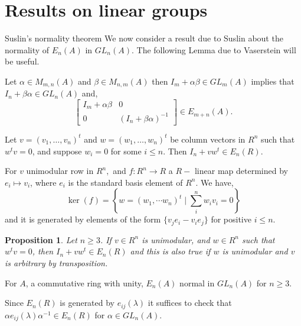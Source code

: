 \documentclass{beamer}
\newcounter{dummy} \numberwithin{dummy}{section}
\newtheorem{proposition}[dummy]{Proposition}
\begin{document}
\section{Results on linear groups}
\begin{frame}[allowframebreaks]{Suslin's normality theorem}
	We now consider a result due to Suslin about the normality of $E_n(A) $ in $GL_n(A)$. The following Lemma due to Vaserstein will be useful.
	\begin{lemma}[Vaserstein]\label{vasersteinlem}
		Let $\alpha \in M_{m,n} (A)$ and $\beta \in M_{n,m}(A)$ then $I_m+\alpha \beta \in GL_m(A)$ implies that $I_n+\beta \alpha \in GL_n(A)$ and, \[ \begin{bmatrix}
			I_m+\alpha \beta & 0 \\ 0 & (I_n+\beta \alpha)^{-1}
		\end{bmatrix} \in E_{m+n} (A).\] 
	\end{lemma}
	\newpage

		\begin{corollary}\label{corofvaserstein}
		Let $v = (v_1,\ldots,v_n)^t$ and $w = (w_1,\ldots,w_n)^t$ be column vectors in $R^n$ such that $w^tv = 0$, and suppose $w_i = 0$ for some $i \leq n$. Then $I_n + vw^t \in E_n(R)$.
	\end{corollary}
	\newpage
	
	\begin{lemma}\label{kernelf}
		For $v$ unimodular row in $R^n,$ and $f: R^n \to R$ a $R-$ linear map determined by $e_i \mapsto v_i $, where $e_i $ is the standard basis element of $R^n$. We have,
		\[ \ker (f) =\left\{w=(w_1,\cdots w_n)^t \mid \sum_i^n w_i v_i =0\right\} \] and it is generated by elements of the form \( \{ v_j e_i - v_i e_j \} \) for positive $i \leq n$.
	\end{lemma}
	\newpage
	\begin{proposition}\label{finalpropfornormality}
		Let $n \geq 3$. If $v \in R^n$ is unimodular, and $w \in R^n$ such that $w^tv = 0$, then $I_n + vw^t \in E_n(R)$ and this is also true if $w$ is unimodular and $v$ is arbitrary by transposition.
	\end{proposition}
	
	\begin{theorem}
		For $A$, a commutative ring with unity, $E_n(A)$ normal in $GL_n(A)$ for $n \geq 3$.  
	\end{theorem}
	
		Since $E_n(R)$ is generated by $e_{ij} (\lambda) $ it suffices to check that $\alpha e_{ij}(\lambda) \alpha^{-1} \in E_n(R)$ for $\alpha \in GL_n(A)$.
		

\end{frame}
\end{document}

